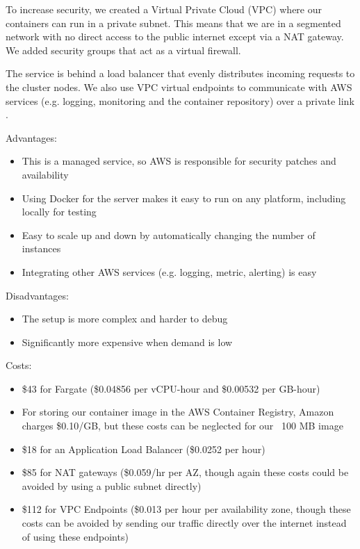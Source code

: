 To increase security, we created a Virtual Private Cloud (VPC) where our containers can run in a private subnet. This means that we are in a segmented network with no direct access to the public internet except via a NAT gateway. We added security groups that act as a virtual firewall.

The service is behind a load balancer that evenly distributes incoming requests to the cluster nodes. We also use VPC virtual endpoints to communicate with AWS services (e.g. logging, monitoring and the container repository) over a private link \cite{amazon-2022F}.


Advantages:
\begin{itemize}
\item This is a managed service, so AWS is responsible for security patches and availability
\item Using Docker for the server makes it easy to run on any platform, including locally for testing
\item Easy to scale up and down by automatically changing the number of instances
\item Integrating other AWS services (e.g. logging, metric, alerting) is easy
\end{itemize}

Disadvantages:
\begin{itemize}
\item The setup is more complex and harder to debug
\item Significantly more expensive when demand is low
\end{itemize}

Costs:
\begin{itemize}
\item \$43 for Fargate (\$0.04856 per vCPU-hour and \$0.00532 per GB-hour)
\item For storing our container image in the AWS Container Registry, Amazon charges \$0.10/GB, but these costs can be neglected for our ~100 MB image
\item \$18 for an Application Load Balancer (\$0.0252 per hour)
\item \$85 for NAT gateways (\$0.059/hr per AZ, though again these costs could be avoided by using a public subnet directly)
\item \$112 for VPC Endpoints (\$0.013 per hour per availability zone, though these costs can be avoided by sending our traffic directly over the internet instead of using these endpoints)
\end{itemize}

